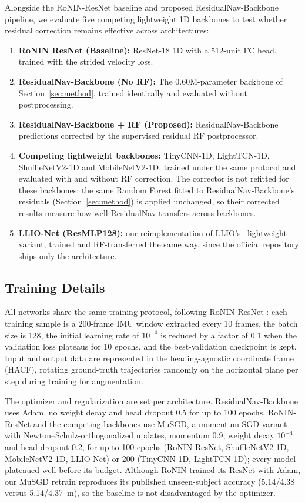 \documentclass[10pt,conference,letterpaper]{IEEEtran}
\begin{document}
Alongside the RoNIN-ResNet baseline and proposed ResidualNav-Backbone
pipeline, we evaluate five competing lightweight 1D backbones to test
whether residual correction remains effective across architectures:
\begin{enumerate}
  \item \textbf{RoNIN ResNet (Baseline):} ResNet-18 1D with a
        512-unit FC head, trained with the strided velocity loss.
  \item \textbf{ResidualNav-Backbone (No RF):} The 0.60M-parameter backbone
        of Section~\ref{sec:method}, trained identically and evaluated
        without postprocessing.
  \item \textbf{ResidualNav-Backbone + RF (Proposed):} ResidualNav-Backbone
        predictions corrected by the supervised residual RF
        postprocessor.
  \item \textbf{Competing lightweight backbones:} TinyCNN-1D,
        LightTCN-1D, ShuffleNetV2-1D and MobileNetV2-1D, trained under
        the same protocol and evaluated with and without RF correction.
        The corrector is not refitted for these backbones: the same
        Random Forest fitted to ResidualNav-Backbone's residuals
        (Section~\ref{sec:method}) is applied unchanged, so their
        corrected results measure how well ResidualNav transfers
        across backbones.
  \item \textbf{LLIO-Net (ResMLP128):} our reimplementation of
        LLIO's~\cite{llio2022} lightweight variant, trained and RF-transferred
        the same way, since the official repository ships only the
        architecture.
\end{enumerate}

\subsection{Training Details}

All networks share the same training protocol, following
RoNIN-ResNet \cite{ronin2019}: each training sample is a 200-frame
IMU window extracted every 10 frames, the batch size is 128, the
initial learning rate of $10^{-4}$ is reduced by a factor of 0.1 when
the validation loss plateaus for 10 epochs, and the
best-validation checkpoint is kept. Input and output data are
represented in the heading-agnostic coordinate frame (HACF), rotating
ground-truth trajectories randomly on the horizontal plane per step
during training for augmentation.

The optimizer and regularization are set per architecture.
ResidualNav-Backbone uses Adam, no weight decay and head dropout 0.5 for up
to 100 epochs. RoNIN-ResNet and the competing backbones use MuSGD, a
momentum-SGD variant with Newton--Schulz-orthogonalized updates,
momentum 0.9, weight decay $10^{-4}$ and head dropout 0.2, for up to
100 epochs (RoNIN-ResNet, ShuffleNetV2-1D, MobileNetV2-1D, LLIO-Net)
or 200 (TinyCNN-1D, LightTCN-1D); every model plateaued well before
its budget. Although RoNIN trained its ResNet with Adam, our MuSGD
retrain reproduces its published unseen-subject accuracy
(5.14/4.38 versus 5.14/4.37~m), so the baseline is not disadvantaged
by the optimizer.
\end{document}
